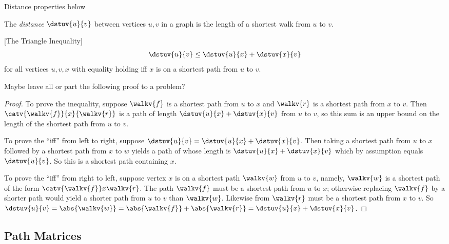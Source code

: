 \begin{editingnotes}
Distance properties below 
\end{editingnotes}

\begin{definition}
  The  \emph{distance} $\dstuv{u}{v}$
  between vertices $u,v$ in a graph is the length of a shortest walk
  from $u$ to $v$.
\end{definition}

\begin{lemma}\label{lem:tri-ineq} [The Triangle Inequality]
\[
\dstuv{u}{v} \leq \dstuv{u}{x} + \dstuv{x}{v}
\]
for all vertices $u,v,x$ with equality holding iff $x$ is on a shortest
path from $u$ to $v$.
\end{lemma}

\begin{editingnotes}
  Maybe leave all or part the following proof to a problem?
\end{editingnotes}

\begin{proof}
  To prove the inequality, suppose $\walkv{f}$ is a shortest path from $u$
  to $x$ and $\walkv{r}$ is a shortest path from $x$ to $v$.  Then
  $\catv{\walkv{f}}{x}{\walkv{r}}$ is a path of length $\dstuv{u}{x} +
  \dstuv{x}{v}$ from $u$ to $v$, so this sum is an upper bound on the
  length of the shortest path from $u$ to $v$.

  To prove the ``iff'' from left to right, suppose $\dstuv{u}{v} =
  \dstuv{u}{x} + \dstuv{x}{v}$.  Then taking a shortest path from $u$ to
  $x$ followed by a shortest path from $x$ to $w$ yields a path of whose
  length is $\dstuv{u}{x} + \dstuv{x}{v}$ which by assumption equals
  $\dstuv{u}{v}$. So this is a shortest path containing $x$.

  To prove the ``iff'' from right to left, suppose vertex $x$ is on a
  shortest path $\walkv{w}$ from $u$ to $v$, namely, $\walkv{w}$ is a
  shortest path of the form $\catv{\walkv{f}}x{\walkv{r}}$.  The path
  $\walkv{f}$ must be a shortest path from $u$ to $x$; otherwise replacing
  $\walkv{f}$ by a shorter path would yield a shorter path from $u$ to $v$
  than $\walkv{w}$.  Likewise from $\walkv{r}$ must be a shortest path
  from $x$ to $v$.  So $\dstuv{u}{v} = \abs{\walkv{w}} = \abs{\walkv{f}} +
  \abs{\walkv{r}} = \dstuv{u}{x} + \dstuv{x}{v}$.
  
\end{proof}

\subsection{Path Matrices}\label{num_walk_subsec}

